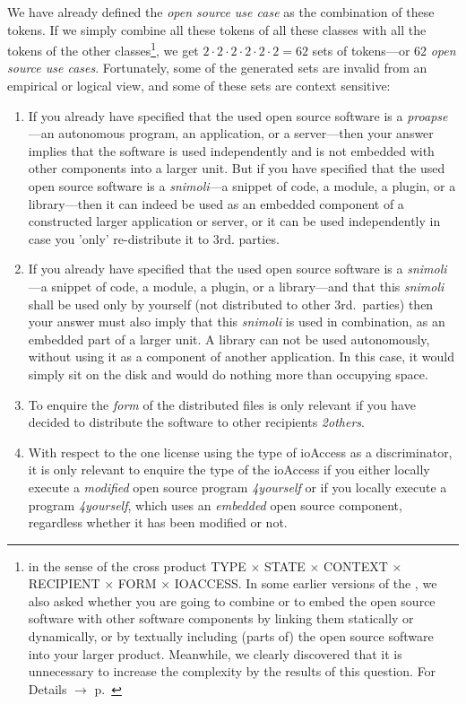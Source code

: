 We have already defined the \emph{open source use case} as the combination of
these tokens. If we simply combine all these tokens of all these classes with
all the tokens of the other classes\footnote{in the sense of the cross product
TYPE $\times$ STATE $\times$ CONTEXT $\times$ RECIPIENT $\times$ FORM $\times$
IOACCESS. In some earlier versions of the \oslic{}, we also asked whether you
are going to combine or to embed the open source software with other software
components by linking them statically or dynamically, or by textually including
(parts of) the open source software into your larger product. Meanwhile, we
clearly discovered that it is unnecessary to increase the complexity by the
results of this question. For Details $\rightarrow$ \oslic{} p.\
\pageref{sec:LinkingSecondary}}, we get $2 \cdot 2 \cdot 2 \cdot 2 \cdot 2 \cdot
2 = 62$ sets of tokens---or 62 \emph{open source use cases}. Fortunately, some
of the generated sets are invalid from an empirical or logical view, and some of
these sets are context sensitive:

\begin{enumerate}
  \label{InvalidFinderTokenCombinations}
  \item If you already have specified that the used open source software is a
  \emph{proapse}---an autonomous program, an application, or a server---then
  your answer implies that the software is used independently and is not
  embedded with other components into a larger unit. But if you have specified
  that the used open source software is a \emph{snimoli}---a snippet of
  code, a module, a plugin, or a library---then it can indeed be used as an
  embedded component of a constructed larger application or server, or it can be
  used independently in case you 'only' re-distribute it to 3rd. parties.
  
  \item If you already have specified that the used open source software is a
  \emph{snimoli}---a snippet of code, a module, a plugin, or a library---and
  that this \emph{snimoli} shall be used only by yourself (not distributed to
  other 3rd.\ parties) then your answer must also imply that this \emph{snimoli}
  is used in combination, as an embedded part of a larger unit. A library can
  not be used autonomously, without using it as a component of another
  application. In this case, it would simply sit on the disk and would do
  nothing more than occupying space.
  
  \item To enquire the \emph{form} of the distributed files is only relevant if
  you have decided to distribute the software to other recipients
  \emph{2others}.
  
  \item With respect to the one license using the type of ioAccess as a
  discriminator, it is only relevant to enquire the type of the ioAccess if you
  either locally execute a \emph{modified} open source program \emph{4yourself}
  or if you locally execute a program \emph{4yourself}, which uses an
  \emph{embedded} open source component, regardless whether it has been modified
  or not.
  
\end{enumerate}

